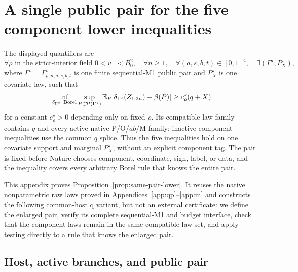 \section{A single public pair for the five component lower inequalities}
\label{app:same-pair}

\begin{proposition}
\label{prop:same-pair-lower}
The displayed quantifiers are
\[
\forall \rho\text{ in the strict-interior field }0<v_-<B_0^2,\quad
\forall n\ge1,\quad
\forall(a,s,b,t)\in[0,1]^4,\quad
\exists(\Gamma^\star,P_X^\star),
\]
where \(\Gamma^\star=\Gamma^\star_{\rho,n,a,s,b,t}\) is one finite sequential-M1 public pair and \(P_X^\star\) is one covariate law, such that
\[
\inf_{\delta_{\Gamma^\star}\ {\rm Borel}}
\sup_{P\in\mathcal P(\Gamma^\star)}
\mathbb E_P\lvert \delta_{\Gamma^\star}(Z_{1:2n})-\beta(P)\rvert
\ge c_\rho^\star(q+X)
\]
for a constant \(c_\rho^\star>0\) depending only on fixed \(\rho\).  Its compatible-law family contains \(q\) and every active native P/O/\(ab\)/M family; inactive component inequalities use the common \(q\) splice.  Thus the five inequalities hold on one covariate support and marginal \(P_X^\star\), without an explicit component tag.  The pair is fixed before Nature chooses component, coordinate, sign, label, or data, and the inequality covers every arbitrary Borel rule that knows the entire pair.
\end{proposition}

This appendix proves Proposition~\ref{prop:same-pair-lower}.  It reuses the
native nonparametric raw laws proved in Appendices~\ref{app:qp}--\ref{app:m}
and constructs the following common-host q variant, but not an
external certificate: we define the enlarged pair, verify its complete
sequential-M1 and budget interface, check that the component laws remain in
the same compatible-law set, and apply testing directly to a rule that knows
the enlarged pair.

\subsection{Host, active branches, and public pair}

